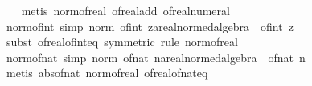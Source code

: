 \begin{isabellebody}
%
\isadelimproof
\ \ %
\endisadelimproof
%
\isatagproof
{}\isamarkupfalse%
\ {\isacharparenleft}{\kern0pt}metis\ norm{\isacharunderscore}{\kern0pt}of{\isacharunderscore}{\kern0pt}real\ of{\isacharunderscore}{\kern0pt}real{\isacharunderscore}{\kern0pt}add\ of{\isacharunderscore}{\kern0pt}real{\isacharunderscore}{\kern0pt}numeral{\isacharparenright}{\kern0pt}%
\endisatagproof
{\isafoldproof}%
%
\isadelimproof
\isanewline
%
\endisadelimproof
\isanewline
{}\isamarkupfalse%
\ norm{\isacharunderscore}{\kern0pt}of{\isacharunderscore}{\kern0pt}int\ {\isacharbrackleft}{\kern0pt}simp{\isacharbrackright}{\kern0pt}{\isacharcolon}{\kern0pt}\ {\isachardoublequoteopen}norm\ {\isacharparenleft}{\kern0pt}of{\isacharunderscore}{\kern0pt}int\ z{\isacharcolon}{\kern0pt}{\isacharcolon}{\kern0pt}{\isacharprime}{\kern0pt}a{\isacharcolon}{\kern0pt}{\isacharcolon}{\kern0pt}real{\isacharunderscore}{\kern0pt}normed{\isacharunderscore}{\kern0pt}algebra{\isacharunderscore}{\kern0pt}{}{\isacharparenright}{\kern0pt}\ {\isacharequal}{\kern0pt}\ {\isasymbar}of{\isacharunderscore}{\kern0pt}int\ z{\isasymbar}{\isachardoublequoteclose}\isanewline
%
\isadelimproof
\ \ %
\endisadelimproof
%
\isatagproof
{}\isamarkupfalse%
\ {\isacharparenleft}{\kern0pt}subst\ of{\isacharunderscore}{\kern0pt}real{\isacharunderscore}{\kern0pt}of{\isacharunderscore}{\kern0pt}int{\isacharunderscore}{\kern0pt}eq\ {\isacharbrackleft}{\kern0pt}symmetric{\isacharbrackright}{\kern0pt}{\isacharcomma}{\kern0pt}\ rule\ norm{\isacharunderscore}{\kern0pt}of{\isacharunderscore}{\kern0pt}real{\isacharparenright}{\kern0pt}%
\endisatagproof
{\isafoldproof}%
%
\isadelimproof
\isanewline
%
\endisadelimproof
\isanewline
{}\isamarkupfalse%
\ norm{\isacharunderscore}{\kern0pt}of{\isacharunderscore}{\kern0pt}nat\ {\isacharbrackleft}{\kern0pt}simp{\isacharbrackright}{\kern0pt}{\isacharcolon}{\kern0pt}\ {\isachardoublequoteopen}norm\ {\isacharparenleft}{\kern0pt}of{\isacharunderscore}{\kern0pt}nat\ n{\isacharcolon}{\kern0pt}{\isacharcolon}{\kern0pt}{\isacharprime}{\kern0pt}a{\isacharcolon}{\kern0pt}{\isacharcolon}{\kern0pt}real{\isacharunderscore}{\kern0pt}normed{\isacharunderscore}{\kern0pt}algebra{\isacharunderscore}{\kern0pt}{}{\isacharparenright}{\kern0pt}\ {\isacharequal}{\kern0pt}\ of{\isacharunderscore}{\kern0pt}nat\ n{\isachardoublequoteclose}\isanewline
%
\isadelimproof
\ \ %
\endisadelimproof
%
\isatagproof
{}\isamarkupfalse%
\ {\isacharparenleft}{\kern0pt}metis\ abs{\isacharunderscore}{\kern0pt}of{\isacharunderscore}{\kern0pt}nat\ norm{\isacharunderscore}{\kern0pt}of{\isacharunderscore}{\kern0pt}real\ of{\isacharunderscore}{\kern0pt}real{\isacharunderscore}{\kern0pt}of{\isacharunderscore}{\kern0pt}nat{\isacharunderscore}{\kern0pt}eq{\isacharparenright}{\kern0pt}%

\end{isabellebody}
